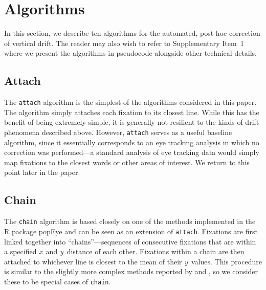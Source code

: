 \documentclass[doc,biblatex]{apa7}
\begin{document}
\section{Algorithms}

In this section, we describe ten algorithms for the automated, post-hoc correction of vertical drift. The reader may also wish to refer to Supplementary Item~1 where we present the algorithms in pseudocode alongside other technical details.

\subsection{Attach}

The \texttt{attach} algorithm is the simplest of the algorithms considered in this paper. The algorithm simply attaches each fixation to its closest line. While this has the benefit of being extremely simple, it is generally not resilient to the kinds of drift phenomena described above. However, \texttt{attach} serves as a useful baseline algorithm, since it essentially corresponds to an eye tracking analysis in which no correction was performed---a standard analysis of eye tracking data would simply map fixations to the closest words or other areas of interest. We return to this point later in the paper.

\subsection{Chain}

The \texttt{chain} algorithm is based closely on one of the methods implemented in the R package popEye \parencite{Schroeder:0000} and can be seen as an extension of \texttt{attach}. Fixations are first linked together into ``chains''---sequences of consecutive fixations that are within a specified \textit{x}~and \textit{y}~distance of each other. Fixations within a chain are then attached to whichever line is closest to the mean of their \textit{y}~values. This procedure is similar to the slightly more complex methods reported by \textcite{Hyrskykari:2006} and \textcite{Mishra:2012}, so we consider these to be special cases of \texttt{chain}.
\end{document}
